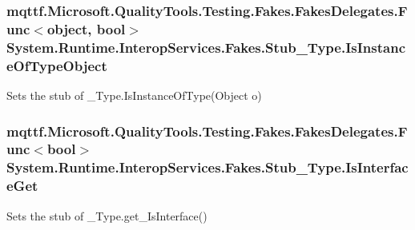 \hypertarget{class_system_1_1_runtime_1_1_interop_services_1_1_fakes_1_1_stub___type_a8fc25573144ac884f02793bb1eb602e3}{
\subsubsection[{Is\-Instance\-Of\-Type\-Object}]{\setlength{\rightskip}{0pt plus 5cm}mqttf.\-Microsoft.\-Quality\-Tools.\-Testing.\-Fakes.\-Fakes\-Delegates.\-Func$<$object, bool$>$ System.\-Runtime.\-Interop\-Services.\-Fakes.\-Stub\-\_\-\-Type.\-Is\-Instance\-Of\-Type\-Object}}\label{class_system_1_1_runtime_1_1_interop_services_1_1_fakes_1_1_stub___type_a8fc25573144ac884f02793bb1eb602e3}


Sets the stub of \-\_\-\-Type.\-Is\-Instance\-Of\-Type(\-Object o)

\hypertarget{class_system_1_1_runtime_1_1_interop_services_1_1_fakes_1_1_stub___type_a3bdce84429412e8be9257c444a0fb007}{
\subsubsection[{Is\-Interface\-Get}]{\setlength{\rightskip}{0pt plus 5cm}mqttf.\-Microsoft.\-Quality\-Tools.\-Testing.\-Fakes.\-Fakes\-Delegates.\-Func$<$bool$>$ System.\-Runtime.\-Interop\-Services.\-Fakes.\-Stub\-\_\-\-Type.\-Is\-Interface\-Get}}\label{class_system_1_1_runtime_1_1_interop_services_1_1_fakes_1_1_stub___type_a3bdce84429412e8be9257c444a0fb007}


Sets the stub of \-\_\-\-Type.\-get\-\_\-\-Is\-Interface()

